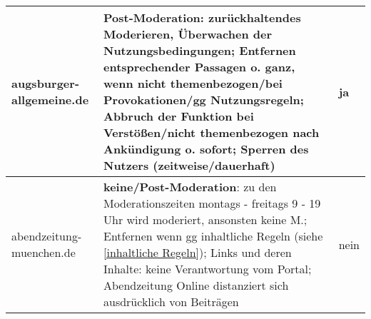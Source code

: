 \begin{longtable}{p{24mm}p{98mm}p{11mm}}
augsburger-allgemeine.de

& {\bfseries Post-Moderation}: zurückhaltendes Moderieren, Überwachen der
  Nutzungsbedingungen; Entfernen entsprechender Passagen o. ganz, wenn nicht
  themenbezogen/bei Provokationen/gg Nutzungsregeln; Abbruch der
  Funktion bei Verstößen/nicht themenbezogen nach Ankündigung o. sofort;
  Sperren  des Nutzers (zeitweise/dauerhaft)
  & \centerline{ja}
\\*\midrule

abendzeitung-muenchen.de

& {\bfseries keine/Post-Moderation}: zu den Moderationszeiten montags - freitags 9 - 19 Uhr
wird moderiert, ansonsten keine M.; Entfernen wenn gg inhaltliche Regeln (siehe \ref{inhaltliche Regeln}); 
Links und  deren Inhalte: keine Verantwortung vom Portal; Abendzeitung Online distanziert sich
ausdrücklich von Beiträgen
  & \centerline{nein}


\end{longtable}

\endgroup

